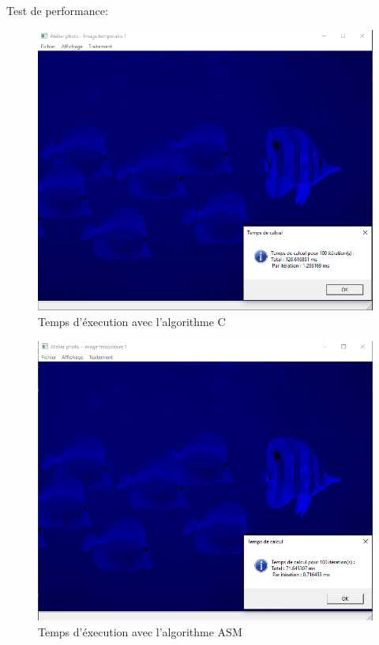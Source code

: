 \documentclass[11pt]{report}
\begin{document}
\newpage
Test de performance:

\begin{figure}[h]
\includegraphics[width=13cm]{CaptureC.png}
\caption{Temps d'éxecution avec l'algorithme C}
\end{figure}

\begin{figure}[h]
\includegraphics[width=13cm]{CaptureASM.png}
\caption{Temps d'éxecution avec l'algorithme ASM}
\end{figure}
\end{document}
